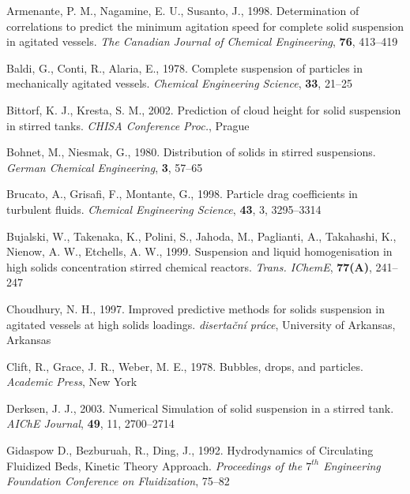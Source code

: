 \begin{thebibliography}{99}

 Armenante, P. M., Nagamine, E. U., Susanto, J., 1998. Determination of correlations to predict the minimum agitation speed for complete solid suspension in agitated vessels. \textit{The Canadian Journal of Chemical Engineering}, \textbf{76}, 413--419

 Baldi, G., Conti, R., Alaria, E., 1978. Complete suspension of particles in mechanically agitated vessels. \textit{Chemical Engineering Science}, \textbf{33}, 21--25 

 Bittorf, K. J., Kresta, S. M., 2002. Prediction of cloud height for solid suspension in stirred tanks. \textit{CHISA Conference Proc.}, Prague

 Bohnet, M., Niesmak, G., 1980. Distribution of solids in stirred suspensions. \textit{German
Chemical Engineering}, \textbf{3}, 57--65

 Brucato, A., Grisafi, F., Montante, G., 1998. Particle drag coefficients in turbulent fluids. \textit{Chemical Engineering Science}, \textbf{43}, 3, 3295--3314

 Bujalski, W., Takenaka, K., Polini, S., Jahoda, M., Paglianti, A., Takahashi, K., Nienow, A. W., Etchells, A. W., 1999. Suspension and liquid homogenisation in high solids concentration stirred chemical reactors. \textit{Trans. IChemE}, \textbf{77(A)}, 241--247

 Choudhury, N. H., 1997. Improved predictive methods for solids suspension in agitated vessels at high solids loadings. \textit{disertační práce},  University of Arkansas, Arkansas

 Clift, R., Grace, J. R., Weber, M. E.,  1978.  Bubbles, drops, and particles. \textit{Academic Press}, New York

 Derksen, J. J., 2003. Numerical Simulation of solid suspension in a stirred tank. \textit{AIChE Journal}, \textbf{49}, 11, 2700--2714

 Gidaspow D., Bezburuah, R., Ding, J., 1992. Hydrodynamics of Circulating Fluidized Beds, Kinetic Theory Approach. \textit{Proceedings of the $7^{th}$ Engineering Foundation Conference on Fluidization}, 75--82


\end{thebibliography}
